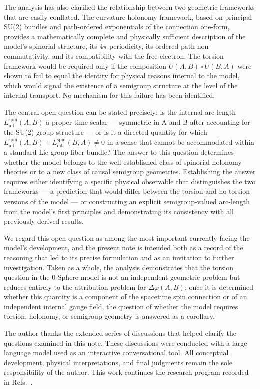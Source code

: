 \documentclass[%
 reprint,
 amsmath,amssymb,
 aps,
 prb,
]{revtex4-2}
\numberwithin{equation}{section}
\newcommand{\Lspin}{L_{\text{int}}^{\text{spin}}}
\begin{document}
The analysis has also clarified the relationship between two geometric frameworks that are easily conflated. The curvature-holonomy framework, based on principal SU(2) bundles and path-ordered exponentials of the connection one-form, provides a mathematically complete and physically sufficient description of the model's spinorial structure, its $4\pi$ periodicity, its ordered-path non-commutativity, and its compatibility with the free electron. The torsion framework would be required only if the composition $U(A,B)\circ U(B,A)$ were shown to fail to equal the identity for physical reasons internal to the model, which would signal the existence of a semigroup structure at the level of the internal transport. No mechanism for this failure has been identified.

The central open question can be stated precisely: is the internal arc-length $\Lspin(A,B)$ a proper-time scalar --- symmetric in A and B after accounting for the SU(2) group structure --- or is it a directed quantity for which $\Lspin(A,B) + \Lspin(B,A) \neq 0$ in a sense that cannot be accommodated within a standard Lie group fiber bundle? The answer to this question determines whether the model belongs to the well-established class of spinorial holonomy theories or to a new class of causal semigroup geometries. Establishing the answer requires either identifying a specific physical observable that distinguishes the two frameworks --- a prediction that would differ between the torsion and no-torsion versions of the model --- or constructing an explicit semigroup-valued arc-length from the model's first principles and demonstrating its consistency with all previously derived results.

We regard this open question as among the most important currently facing the model's development, and the present note is intended both as a record of the reasoning that led to its precise formulation and as an invitation to further investigation. Taken as a whole, the analysis demonstrates that the torsion question in the 0-Sphere model is not an independent geometric problem but reduces entirely to the attribution problem for $\Delta\varphi(A,B)$: once it is determined whether this quantity is a component of the spacetime spin connection or of an independent internal gauge field, the question of whether the model requires torsion, holonomy, or semigroup geometry is answered as a corollary.

\begin{acknowledgments}
The author thanks the extended series of discussions that helped clarify the questions examined in this note. These discussions were conducted with a large language model used as an interactive conversational tool. All conceptual development, physical interpretations, and final judgments remain the sole responsibility of the author. This work continues the research program recorded in Refs.~\cite{paper29,paper30,paper31,paper32,paper33,paper35,paper38,paper40}.
\end{acknowledgments}
\end{document}
